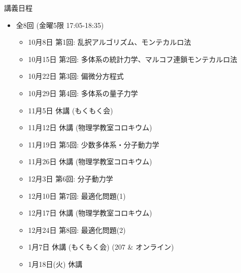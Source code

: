 \begin{frame}[t]{講義日程}
  \begin{itemize}
  \item 全8回 (金曜5限 17:05-18:35)
    \begin{itemize}
    \item {\color{gray} 10月8日 第1回: 乱択アルゴリズム、モンテカルロ法}
    \item {\color{gray} 10月15日 第2回: 多体系の統計力学、マルコフ連鎖モンテカルロ法}
    \item {\color{gray} 10月22日 第3回: 偏微分方程式}
    \item {\color{gray} 10月29日 第4回: 多体系の量子力学}
    \item {\color{gray} 11月5日 休講 (もくもく会)}
    \item {\color{gray} 11月12日 休講 (物理学教室コロキウム)}
    \item {\color{gray} 11月19日 第5回: 少数多体系・分子動力学}
    \item {\color{gray} 11月26日 休講 (物理学教室コロキウム)}
    \item {\color{gray} 12月3日 第6回: 分子動力学}
    \item {\color{gray} 12月10日 第7回: 最適化問題(1)}
    \item {\color{gray} 12月17日 休講 (物理学教室コロキウム)}
    \item {\color{gray} 12月24日 第8回: 最適化問題(2)}
    \item 1月7日 休講 (もくもく会) (207 \& オンライン)
    \item {\color{gray} 1月18日(火) 休講}
    \end{itemize}
  \end{itemize}
\end{frame}
